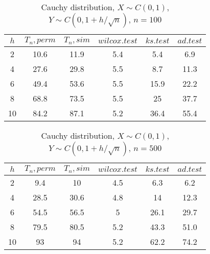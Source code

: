 \documentclass{svproc}
\begin{document}
\begin{table}
  \caption{Cauchy distribution, $X\sim C(0,1)$, $Y\sim C(0, 1 + h/\sqrt{n})$, $n=100$}
  \begin{center}
  \begin{tabular}{c@{\quad}c@{\quad}c@{\quad}c@{\quad}c@{\quad}c}
  \hline
  $h$ & $T_n, perm$ & $T_n, sim$ & $wilcox.test$ & $ks.test$ & $ad.test$ \\
  \hline
  2 & 10.6 & 11.9 & 5.4 & 5.4 & 6.9 \\
  4 & 27.6 & 29.8 & 5.5 & 8.7 & 11.3 \\
  6 & 49.4 & 53.6 & 5.5 & 15.9 & 22.2 \\
  8 & 68.8 & 73.5 & 5.5 & 25 & 37.7 \\
  10 & 84.2 & 87.1 & 5.2 & 36.4 & 55.4 \\
  \hline
  \end{tabular}
  \end{center}
\end{table}

\begin{table}
  \caption{Cauchy distribution, $X\sim C(0,1)$, $Y\sim C(0, 1 + h/\sqrt{n})$, $n=500$}
  \begin{center}
  \begin{tabular}{c@{\quad}c@{\quad}c@{\quad}c@{\quad}c@{\quad}c}
  \hline
  $h$ & $T_n, perm$ & $T_n, sim$ & $wilcox.test$ & $ks.test$ & $ad.test$ \\
  \hline
  2 & 9.4 & 10 & 4.5 & 6.3 & 6.2 \\
  4 & 28.5 & 30.6 & 4.8 & 14 & 12.3 \\
  6 & 54.5 & 56.5 & 5 & 26.1 & 29.7 \\
  8 & 79.5 & 80.5 & 5.2 & 43.3 & 51.0 \\
  10 & 93 & 94 & 5.2 & 62.2 & 74.2 \\
  \hline
  \end{tabular}
  \end{center}
\end{table}
\end{document}
